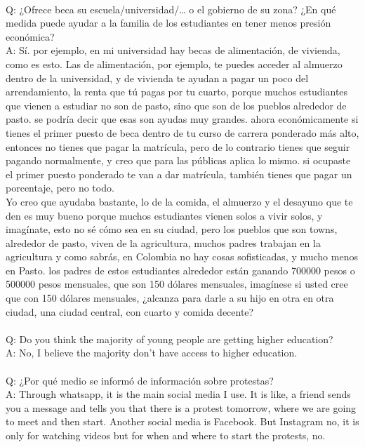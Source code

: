 \documentclass{phyasgn}\usepackage{nag}
\begin{document}
\\
Q: ¿Ofrece beca su escuela/universidad/… o el gobierno de su zona? ¿En qué medida puede ayudar a la familia de los estudiantes en tener menos presión económica?\\
A: Sí. por ejemplo, en mi universidad hay becas de alimentación, de vivienda, como es esto. Las de alimentación, por ejemplo, te puedes acceder al almuerzo dentro de la universidad, y de vivienda te ayudan a pagar un poco del arrendamiento, la renta que tú pagas por tu cuarto, porque muchos estudiantes que vienen a estudiar no son de pasto, sino que son de los pueblos alrededor de pasto. se podría decir que esas son ayudas muy grandes. ahora económicamente si tienes el primer puesto de beca dentro de tu curso de carrera ponderado más alto, entonces no tienes que pagar la matrícula, pero de lo contrario tienes que seguir pagando normalmente, y creo que para las públicas aplica lo mismo. si ocupaste el primer puesto ponderado te van a dar matrícula, también tienes que pagar un porcentaje, pero no todo. \\
Yo creo que ayudaba bastante, lo de la comida, el almuerzo y el desayuno que te den es muy bueno porque muchos estudiantes vienen solos a vivir solos, y imagínate, esto no sé cómo sea en su ciudad, pero los pueblos que son towns, alrededor de pasto, viven de la agricultura, muchos padres trabajan en la agricultura y como sabrás, en Colombia no hay cosas sofisticadas, y mucho menos en Pasto. los padres de estos estudiantes alrededor están ganando 700000 pesos o 500000 pesos mensuales, que son 150 dólares mensuales, imagínese si usted cree que con 150 dólares mensuales, ¿alcanza para darle a su hijo en otra en otra ciudad, una ciudad central, con cuarto y comida decente?\\
\\
Q: Do you think the majority of young people are getting higher education?\\
A: No, I believe the majority don’t have access to higher education.\\
\\
Q: ¿Por qué medio se informó de información sobre protestas?\\
A: Through whatsapp, it is the main social media I use. It is like, a friend sends you a message and tells you that there is a protest tomorrow, where we are going to meet and then start. Another social media is Facebook. But Instagram no, it is only for watching videos but for when and where to start the protests, no.\\
\end{document}
